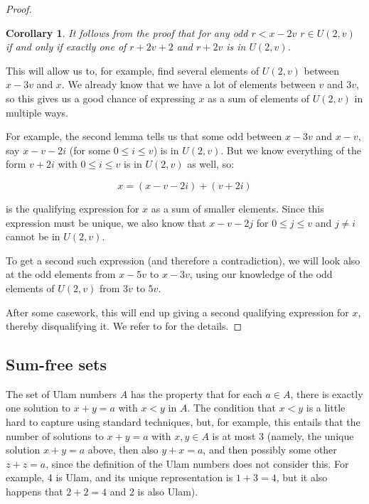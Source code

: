 \documentclass{article}
\newtheorem{corollary}{Corollary}[theorem]
\theoremstyle{definition}
\theoremstyle{remark}
\numberwithin{equation}{section}
\begin{document}
\begin{proof}
  \begin{corollary}
    It follows from the proof that for any odd $r < x-2v$
    $r \in U(2,v)$ if and only if exactly one of $r+2v+2$ and $r+2v$
    is in $U(2,v)$.
  \end{corollary}

  This will allow us to, for example, find several elements of
  $U(2,v)$ between $x-3v$ and $x$.  We already know that we have a lot
  of elements between $v$ and $3v$, so this gives us a good chance of
  expressing $x$ as a sum of elements of $U(2,v)$ in multiple ways.  

  For example, the second lemma tells us that some odd between $x-3v$
  and $x-v$, say $x-v-2i$ (for some $0 \leq i \leq v$) is in
  $U(2,v)$.  But we know everything of the form $v+2i$ with $0 \leq i
  \leq v$ is in $U(2,v)$ as well, so: 

  \[x = (x-v-2i)+(v+2i)\]

  is the qualifying expression for $x$ as a sum of smaller elements.
  Since this expression must be unique, we also know that $x-v-2j$ for
  $0 \leq j \leq v$ and $j \neq i$ cannot be in $U(2,v)$.  

  To get a second such expression (and therefore a contradiction), we
  will look also at the odd elements from $x-5v$ to $x-3v$, using our
  knowledge of the odd elements of $U(2,v)$ from $3v$ to $5v$.  

  After some casework, this will end up giving a second qualifying
  expression for $x$, thereby disqualifying it.  We refer to
  \cite{regularity_schmerl} for the details.
  

  \end{proof}

\subsection{Sum-free sets}

The set of Ulam numbers $A$ has the property that for each $a \in A$,
there is exactly one solution to $x+y=a$ with $x < y$ in $A$.  The
condition that $x < y$ is a little hard to capture using standard
techniques, but, for example, this entails that the number of
solutions to $x + y = a$ with $x, y \in A$ is at most 3 (namely, the
unique solution $x+y = a$ above, then also $y+x = a$, and then
possibly some other $z+z = a$, since the definition of the Ulam
numbers does not consider this.  For example, 4 is Ulam, and its
unique representation is $1+3=4$, but it also happens that $2+2=4$ and
2 is also Ulam).
\end{document}
